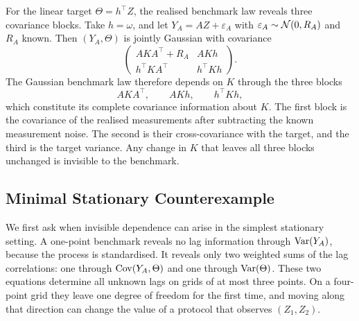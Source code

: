 For the linear target $\Theta=h^\top Z$, the realised benchmark law reveals
three covariance blocks. Take $h=\omega$, and let
$Y_A=AZ+\varepsilon_A$ with $\varepsilon_A\sim\mathcal{N}(0,R_A)$ and $R_A$ known.
Then $(Y_A,\Theta)$ is jointly Gaussian with covariance
\begin{equation}
\begin{pmatrix}
AKA^\top+R_A & AKh\\
h^\top KA^\top & h^\top Kh
\end{pmatrix}.
\label{eq:observables}
\end{equation}
The Gaussian benchmark law therefore depends on $K$ through the three blocks
\begin{equation}
AKA^\top,\qquad AKh,\qquad h^\top Kh,
\label{eq:three-blocks}
\end{equation}
which constitute its complete covariance information about $K$. The first
block is the covariance of the realised measurements after subtracting the
known measurement noise. The second is their cross-covariance with the target,
and the third is the target variance. Any change in $K$ that leaves all three
blocks unchanged is invisible to the benchmark.



\subsection{Minimal Stationary Counterexample}

We first ask when invisible dependence can arise in the simplest stationary
setting. A one-point benchmark reveals no lag information through
$\operatorname{Var}(Y_A)$, because the process is standardised. It reveals only two weighted
sums of the lag correlations: one through
$\operatorname{Cov}(Y_A,\Theta)$ and one through $\operatorname{Var}(\Theta)$. These two equations determine
all unknown lags on grids of at most three points. On a four-point grid they
leave one degree of freedom for the first time, and moving along that direction
can change the value of a protocol that observes $(Z_1,Z_2)$.

